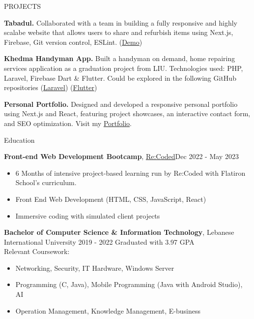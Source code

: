 \documentclass{resume} %
\begin{document}
\begin{rSection}{PROJECTS}
\vspace{-1.25em}
\item \textbf{Tabadul.} {Collaborated with a team in building a fully responsive and highly scalabe website that allows users to share and refurbish items using Next.js, Firebase, Git version control, ESLint. (\href{https://tabadul.vercel.app/}{Demo})}
\item \textbf{Khedma Handyman App.} {Built a handyman on demand, home repairing services application as a graduation project from LIU. Technologies used: PHP, Laravel, Firebase Dart \& Flutter. Could be explored in the following GitHub repositories (\href{https://github.com/AhmadHRai/KhedmaProjectLaravel}{Laravel}) (\href{https://github.com/AhmadHRai/KhedmaProjectFlutter}{Flutter})}
\item \textbf{Personal Portfolio.} {Designed and developed a responsive personal portfolio using Next.js and React, featuring project showcases, an interactive contact form, and SEO optimization. Visit my \href{https://ahmadalrai.com}{Portfolio}.}
\end{rSection}



\begin{rSection}{Education}

{\bf Front-end Web Development Bootcamp}, \href{https://www.re-coded.com/}{Re:Coded}\hfill {Dec 2022 - May 2023}
 \begin{itemize}
    \itemsep -3pt {} 
     \item 6 Months of intensive project-based learning run by Re:Coded with Flatiron School's curriculum.
     \item Front End Web Development (HTML, CSS, JavaScript, React)
     \item Immersive coding with simulated client projects\\
 \end{itemize}



{\bf Bachelor of Computer Science \& Information Technology}, Lebanese International University \hfill {2019 - 2022}
Graduated with 3.97 GPA \smallskip \\
Relevant Coursework:
\begin{itemize}
    \itemsep -3pt {} 
    \item Networking, Security, IT Hardware, Windows Server
    \item Programming (C, Java), Mobile Programming (Java with Android Studio), AI
    \item Operation Management, Knowledge Management, E-business
\end{itemize}

\end{rSection}
\end{document}

